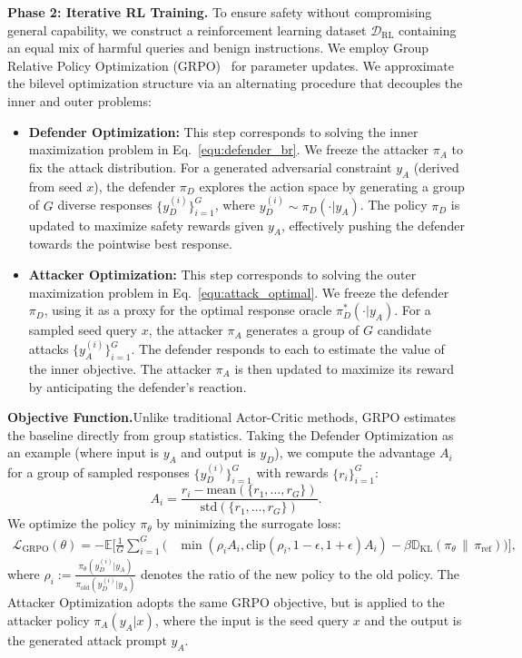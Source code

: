 \documentclass[11pt, letterpaper]{template}
\theoremstyle{plain}
\theoremstyle{definition}
\theoremstyle{remark}
\begin{document}
\textbf{Phase 2: Iterative RL Training.}
\quad To ensure safety without compromising general capability, we construct a reinforcement learning dataset $\mathcal{D}_{\text{RL}}$ containing an equal mix of harmful queries and benign instructions. We employ Group Relative Policy Optimization (GRPO)~\citep{guo2025deepseek} for parameter updates. We approximate the bilevel optimization structure via an alternating procedure that decouples the inner and outer problems:

\begin{itemize}[leftmargin=*]
    \item \textbf{Defender Optimization:} This step corresponds to solving the inner maximization problem in Eq.~\eqref{equ:defender_br}. We freeze the attacker $\pi_A$ to fix the attack distribution. For a generated adversarial constraint $y_A$ (derived from seed $x$), the defender $\pi_D$ explores the action space by generating a group of $G$ diverse responses $\{y_D^{(i)}\}_{i=1}^G$, where $y_D^{(i)} \sim \pi_D(\cdot | y_A)$. The policy $\pi_D$ is updated to maximize safety rewards given $y_A$, effectively pushing the defender towards the pointwise best response.
    
    \item \textbf{Attacker Optimization:} This step corresponds to solving the outer maximization problem in Eq.~\eqref{equ:attack_optimal}. We freeze the defender $\pi_D$, using it as a proxy for the optimal response oracle $\pi_D^*(\cdot|y_A)$. For a sampled seed query $x$, the attacker $\pi_A$ generates a group of $G$ candidate attacks $\{y_A^{(i)}\}_{i=1}^G$. The defender responds to each to estimate the value of the inner objective. The attacker $\pi_A$ is then updated to maximize its reward by anticipating the defender's reaction.
\end{itemize}

\textbf{Objective Function.}\quad Unlike traditional Actor-Critic methods, GRPO estimates the baseline directly from group statistics. Taking the Defender Optimization as an example (where input is $y_A$ and output is $y_D$), we compute the advantage $A_i$ for a group of sampled responses $\{y_D^{(i)}\}_{i=1}^G$ with rewards $\{r_i\}_{i=1}^G$:
\begin{equation}
    A_i = \frac{r_i - \text{mean}(\{r_1, \dots, r_G\})}{\text{std}(\{r_1, \dots, r_G\})}.
\end{equation}
We optimize the policy $\pi_\theta$ by minimizing the surrogate loss:
\begin{equation}
\begin{aligned}
\mathcal{L}_{\text{GRPO}}(\theta)
= -\mathbb{E} \bigg[ \frac{1}{G} \sum_{i=1}^{G} \Big(
& \min \left( \rho_i A_i, \text{clip}(\rho_i, 1-\epsilon, 1+\epsilon) A_i \right) - \beta \mathbb{D}_{\text{KL}}(\pi_\theta \,\|\, \pi_{\text{ref}})
\Big) \bigg],
\end{aligned}
\end{equation}
where $\rho_i := \frac{\pi_\theta(y_D^{(i)}|y_A)}{\pi_{\text{old}}(y_D^{(i)}|y_A)}$ denotes the ratio of the new policy to the old policy. The Attacker Optimization adopts the same GRPO objective, but is applied to the attacker policy $\pi_A(y_A|x)$, where the input is the seed query $x$ and the output is the generated attack prompt $y_A$.
\end{document}

